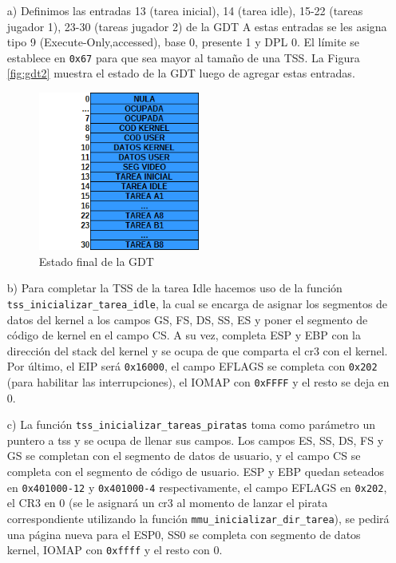 \begin{enumerate}

\item[a)]Definimos las entradas 13 (tarea inicial), 14 (tarea idle), 15-22 (tareas jugador 1), 23-30 (tareas jugador 2) de la GDT
A estas entradas se les asigna tipo 9 (Execute-Only,accessed), base 0, presente 1 y DPL 0. El límite se establece en {\tt 0x67} para que sea mayor al tamaño de una TSS. La Figura \ref{fig:gdt2} muestra el estado de la GDT luego de agregar estas entradas.

\begin{figure}
  \centering
    \includegraphics[width=0.50\textwidth]{imagenes/gdtfinal.png}
  \caption{Estado final de la GDT}
  \label{fig:gdt final}
\end{figure}
 \FloatBarrier

\item[b)]Para completar la TSS de la tarea Idle hacemos uso de la función {\tt tss\_inicializar\_tarea\_idle}, la cual se encarga de asignar los segmentos de datos del kernel a los campos GS, FS, DS, SS, ES y poner el segmento de código de kernel en el campo CS. A su vez, completa ESP y EBP con la dirección del stack del kernel y se ocupa de que comparta el cr3 con el kernel. Por último, el EIP será {\tt 0x16000}, el campo EFLAGS se completa con {\tt 0x202} (para habilitar las interrupciones), el IOMAP con {\tt 0xFFFF} y el resto se deja en 0.

\item[c)] La función {\tt tss\_inicializar\_tareas\_piratas} toma como parámetro un puntero a tss y se ocupa de llenar sus campos. Los campos ES, SS, DS, FS y GS se completan con el segmento de datos de usuario, y el campo CS se completa con el segmento de código de usuario. ESP y EBP quedan seteados en {\tt 0x401000-12} y {\tt 0x401000-4} respectivamente, el campo EFLAGS en {\tt 0x202}, el CR3 en 0 (se le asignará un cr3 al momento de lanzar el pirata correspondiente utilizando la función {\tt mmu_inicializar_dir_tarea}), se pedirá una página nueva para el ESP0, SS0 se completa con segmento de datos kernel, IOMAP con {\tt 0xffff} y el resto con 0. 


\end{enumerate}
